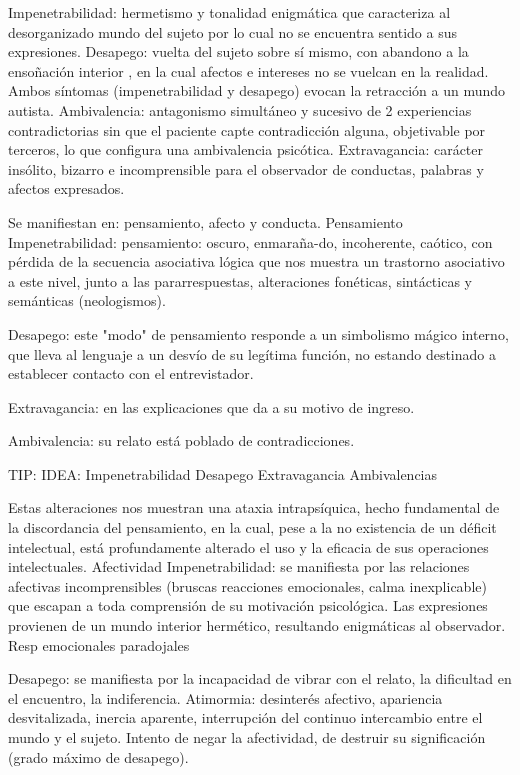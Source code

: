 Impenetrabilidad: hermetismo y tonalidad enigmática que caracteriza al desorganizado mundo del sujeto por lo cual no se encuentra sentido a sus expresiones. Desapego: vuelta del sujeto sobre sí mismo, con abandono a la ensoñación interior , en la cual afectos e intereses no se vuelcan en la realidad. Ambos síntomas (impenetrabilidad y desapego) evocan la retracción a un mundo autista. Ambivalencia: antagonismo simultáneo y sucesivo de 2 experiencias contradictorias sin que el paciente capte contradicción alguna, objetivable por terceros, lo que configura una ambivalencia psicótica. Extravagancia: carácter insólito, bizarro e incomprensible para el observador de conductas, palabras y afectos expresados.

Se manifiestan en: pensamiento, afecto y conducta. Pensamiento Impenetrabilidad: pensamiento: oscuro, enmaraña-do, incoherente, caótico, con pérdida de la secuencia asociativa lógica que nos muestra un trastorno asociativo a este nivel, junto a las pararrespuestas, alteraciones fonéticas, sintácticas y semánticas (neologismos).

Desapego: este "modo" de pensamiento responde a un simbolismo mágico interno, que lleva al lenguaje a un desvío de su legítima función, no estando destinado a establecer contacto con el entrevistador.

Extravagancia: en las explicaciones que da a su motivo de ingreso.

Ambivalencia: su relato está poblado de contradicciones.

TIP: IDEA: Impenetrabilidad Desapego Extravagancia Ambivalencias

Estas alteraciones nos muestran una ataxia intrapsíquica, hecho fundamental de la discordancia del pensamiento, en la cual, pese a la no existencia de un déficit intelectual, está profundamente alterado el uso y la eficacia de sus operaciones intelectuales. Afectividad Impenetrabilidad: se manifiesta por las relaciones afectivas incomprensibles (bruscas reacciones emocionales, calma inexplicable) que escapan a toda comprensión de su motivación psicológica. Las expresiones provienen de un mundo interior hermético, resultando enigmáticas al observador. Resp emocionales paradojales

Desapego: se manifiesta por la incapacidad de vibrar con el relato, la dificultad en el encuentro, la indiferencia. Atimormia: desinterés afectivo, apariencia desvitalizada, inercia aparente, interrupción del continuo intercambio entre el mundo y el sujeto. Intento de negar la afectividad, de destruir su significación (grado máximo de desapego).

